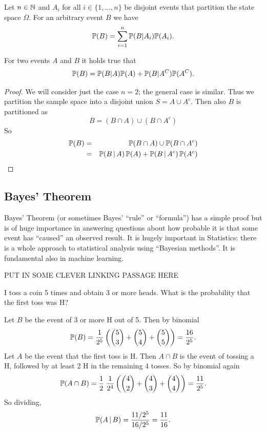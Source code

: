 \begin{prop}
Let $n\in {\mathbb N}$ and $A_i$ for all $i \in \{1,\ldots,n\}$ be disjoint events that partition the state space $\Omega$. For an arbitrary event $B$ we have
\begin{align*}
{\mathbb P}(B)
= \sum_{i=1}^n {\mathbb P}(B \vert A_i ) {\mathbb P}(A_i).
\end{align*}
\end{prop}
\begin{corr}
For two events $A$ and $B$ it holds true that
\begin{align*}
{\mathbb P}(B) = {\mathbb P}(B \vert A) {\mathbb P}(A) + {\mathbb P}(B \vert A^C) {\mathbb P}(A^C)
.
\end{align*}
\end{corr}
\begin{proof}
We will consider just the case $n=2$; the general case is similar. Thus we partition the sample space into a disjoint union $S = A \cup A^c$.  Then also $B$ is partitioned as 
 \[
    B = ( B \cap A ) \cup (B \cap A^c) 
 \]
So 
 \begin{eqnarray*}
    {\mathbb P}(B) & =& {\mathbb P}( B \cap A ) \cup {\mathbb P} (B \cap A^c) \\ 
     &=& {\mathbb P}(B \, | \, A) \, {\mathbb P}(A) + {\mathbb P}(B \, | \, A^c) \, {\mathbb P}(A^c)
 \end{eqnarray*} 
\end{proof}
\subsection{Bayes' Theorem} 

Bayes' Theorem (or sometimes Bayes' ``rule'' or ``formula'') has a simple proof but is of huge importance in  answering questions about how probable it is that some event has ``caused'' an observed result.  It is hugely important in Statistics: there is a whole approach to statistical analysis using ``Bayesian methods''.  It is fundamental also in machine learning. 

\begin{center}
    PUT IN SOME CLEVER LINKING PASSAGE HERE
\end{center}
I toss a coin 5 times and obtain 3 or more heads.  What is the probability that the first toss was H? 

Let $B$ be the event of 3 or more H out of 5.  Then by binomial 
 \[
     {\mathbb P}( B) = \frac1{2^5}\left(  \binom53 + \binom54 + \binom55 \right)   =  \frac{16}{2^5}.
 \]
Let $A$ be the event that the first toss is H.  Then $A \cap B$ is the event of tossing a H, followed by at least 2 H in the remaining 4 tosses. So by binomial again 
 \[
   {\mathbb P}(A \cap B) = \frac12 \; \frac1{2^4} \left(  \binom42 + \binom43 +\binom 44\right) = \frac{11}{2^5}.
 \]
 So dividing, 
  \[
  {\mathbb P}(A \, | \, B) = \frac{11/2^5}{16/2^5} = \frac{11}{16}.  
 \]

